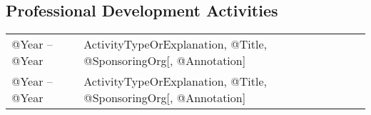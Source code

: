 \documentclass[10pt]{article}
\begin{document}
\begin{IOWA ONLY}
\subsection*{Professional Development Activities}

\begin{tabular}{l@{\quad\ }p{34em}} 
 @Year -- @Year 
 & ActivityTypeOrExplanation, @Title, @SponsoringOrg[, @Annotation]
 \\[.5ex]
 @Year -- @Year 
 & ActivityTypeOrExplanation, @Title, @SponsoringOrg[, @Annotation]
\end{tabular}

\end{IOWA ONLY}
\end{document}
